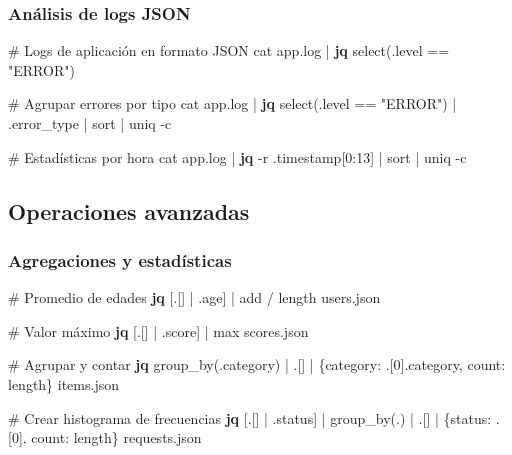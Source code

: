 \documentclass[
  11pt,
  letterpaper,
  oneside,
  openany]{scrbook}
\newenvironment{Shaded}{}{}
\newcommand{\AttributeTok}[1]{\textcolor[rgb]{0.84,0.23,0.29}{#1}}
\newcommand{\CommentTok}[1]{\textcolor[rgb]{0.42,0.45,0.49}{#1}}
\newcommand{\ExtensionTok}[1]{\textcolor[rgb]{0.84,0.23,0.29}{\textbf{#1}}}
\newcommand{\FunctionTok}[1]{\textcolor[rgb]{0.44,0.26,0.76}{#1}}
\newcommand{\KeywordTok}[1]{\textcolor[rgb]{0.84,0.23,0.29}{#1}}
\newcommand{\NormalTok}[1]{\textcolor[rgb]{0.14,0.16,0.18}{#1}}
\newcommand{\StringTok}[1]{\textcolor[rgb]{0.01,0.18,0.38}{#1}}
\begin{document}
\subsubsection{Análisis de logs JSON}\label{anuxe1lisis-de-logs-json}

\begin{Shaded}
\begin{Highlighting}[]
\CommentTok{\# Logs de aplicación en formato JSON}
\FunctionTok{cat}\NormalTok{ app.log }\KeywordTok{|} \ExtensionTok{jq} \StringTok{\textquotesingle{}select(.level == "ERROR")\textquotesingle{}} 

\CommentTok{\# Agrupar errores por tipo}
\FunctionTok{cat}\NormalTok{ app.log }\KeywordTok{|} \ExtensionTok{jq} \StringTok{\textquotesingle{}select(.level == "ERROR") | .error\_type\textquotesingle{}} \KeywordTok{|} \FunctionTok{sort} \KeywordTok{|} \FunctionTok{uniq} \AttributeTok{{-}c}

\CommentTok{\# Estadísticas por hora}
\FunctionTok{cat}\NormalTok{ app.log }\KeywordTok{|} \ExtensionTok{jq} \AttributeTok{{-}r} \StringTok{\textquotesingle{}.timestamp[0:13]\textquotesingle{}} \KeywordTok{|} \FunctionTok{sort} \KeywordTok{|} \FunctionTok{uniq} \AttributeTok{{-}c}
\end{Highlighting}
\end{Shaded}

\subsection{Operaciones avanzadas}\label{operaciones-avanzadas}

\subsubsection{Agregaciones y
estadísticas}\label{agregaciones-y-estaduxedsticas}

\begin{Shaded}
\begin{Highlighting}[]
\CommentTok{\# Promedio de edades}
\ExtensionTok{jq} \StringTok{\textquotesingle{}[.[] | .age] | add / length\textquotesingle{}}\NormalTok{ users.json}

\CommentTok{\# Valor máximo}
\ExtensionTok{jq} \StringTok{\textquotesingle{}[.[] | .score] | max\textquotesingle{}}\NormalTok{ scores.json}

\CommentTok{\# Agrupar y contar}
\ExtensionTok{jq} \StringTok{\textquotesingle{}group\_by(.category) | .[] | \{category: .[0].category, count: length\}\textquotesingle{}}\NormalTok{ items.json}

\CommentTok{\# Crear histograma de frecuencias}
\ExtensionTok{jq} \StringTok{\textquotesingle{}[.[] | .status] | group\_by(.) | .[] | \{status: .[0], count: length\}\textquotesingle{}}\NormalTok{ requests.json}
\end{Highlighting}
\end{Shaded}
\end{document}
